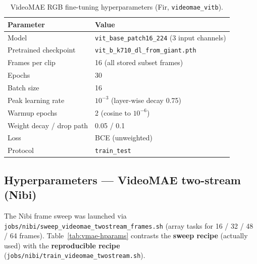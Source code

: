 \documentclass[11pt,a4paper]{article}
\begin{document}
\begin{table}[h]
\centering
\caption{VideoMAE RGB fine-tuning hyperparameters (Fir, \texttt{videomae\_vitb}).}
\label{tab:vmae-rgb-hparams}
\small
\begin{tabular}{@{}ll@{}}
\toprule
Parameter & Value \\
\midrule
Model & \texttt{vit\_base\_patch16\_224} (3 input channels) \\
Pretrained checkpoint & \texttt{vit\_b\_k710\_dl\_from\_giant.pth} \\
Frames per clip & 16 (all stored subset frames) \\
Epochs & 30 \\
Batch size & 16 \\
Peak learning rate & $10^{-3}$ (layer-wise decay 0.75) \\
Warmup epochs & 2 (cosine to $10^{-6}$) \\
Weight decay / drop path & 0.05 / 0.1 \\
Loss & BCE (unweighted) \\
Protocol & \texttt{train\_test} \\
\bottomrule
\end{tabular}
\end{table}

\subsection{Hyperparameters --- VideoMAE two-stream (Nibi)}

The Nibi frame sweep was launched via \texttt{jobs/nibi/sweep\_videomae\_twostream\_frames.sh}
(array tasks for 16 / 32 / 48 / 64 frames). Table~\ref{tab:vmae-hparams} contrasts the
\textbf{sweep recipe} (actually used) with the \textbf{reproducible recipe}
(\texttt{jobs/nibi/train\_videomae\_twostream.sh}).
\end{document}
